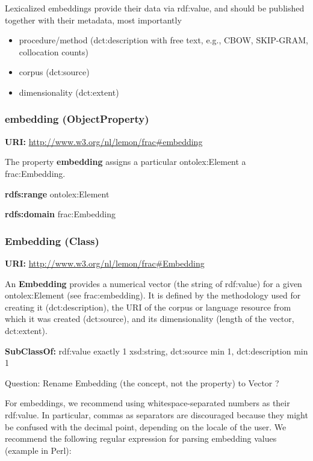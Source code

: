 \documentclass[a4paper]{article}
\newcommand\textstyleStrongEmphasis[1]{\textbf{#1}}
\newcommand\textstyleTeletype[1]{\textrm{#1}}
\newcommand\liststyleWWNumvi{%
\renewcommand\labelitemi{[F0B7?]}
\renewcommand\labelitemii{[F0B7?]}
\renewcommand\labelitemiii{[F0B7?]}
\renewcommand\labelitemiv{[F0B7?]}
}
\begin{document}
Lexicalized embeddings provide their data via \textstyleTeletype{rdf:value}, and should be published together with their metadata, most importantly 

\liststyleWWNumvi
\begin{itemize}
\item procedure/method (\textstyleTeletype{dct:description} with free text, e.g., {\textquotedbl}CBOW{\textquotedbl}, {\textquotedbl}SKIP-GRAM{\textquotedbl}, {\textquotedbl}collocation counts{\textquotedbl}) 
\item corpus (\textstyleTeletype{dct:source}) 
\item dimensionality (\textstyleTeletype{dct:extent}) 
\end{itemize}
\subsubsection[embedding (ObjectProperty)]{embedding (ObjectProperty)}
\textstyleStrongEmphasis{URI:} \url{http://www.w3.org/nl/lemon/frac#embedding}

The property \textstyleStrongEmphasis{embedding} assigns a particular ontolex:Element a frac:Embedding.

\textstyleStrongEmphasis{rdfs:range} ontolex:Element

\textstyleStrongEmphasis{rdfs:domain} frac:Embedding

\subsubsection[Embedding (Class)]{Embedding (Class)}
\textstyleStrongEmphasis{URI:} \url{http://www.w3.org/nl/lemon/frac#Embedding}

An \textstyleStrongEmphasis{Embedding} provides a numerical vector (the string of \textstyleTeletype{rdf:value}) for a given ontolex:Element (see \textstyleTeletype{frac:embedding}). It is defined by the methodology used for creating it (\textstyleTeletype{dct:description}), the URI of the corpus or language resource from which it was created (\textstyleTeletype{dct:source}), and its dimensionality (length of the vector, \textstyleTeletype{dct:extent}).

\textstyleStrongEmphasis{SubClassOf:} rdf:value exactly 1 xsd:string, dct:source min 1, dct:description min 1

Question: Rename {\textquotedbl}Embedding{\textquotedbl} (the concept, not the property) to {\textquotedbl}Vector{\textquotedbl} ?

For embeddings, we recommend using whitespace-separated numbers as their \textstyleTeletype{rdf:value}. In particular, commas as separators are discouraged because they might be confused with the decimal point, depending on the locale of the user. We recommend the following regular expression for parsing embedding values (example in Perl):
\end{document}
